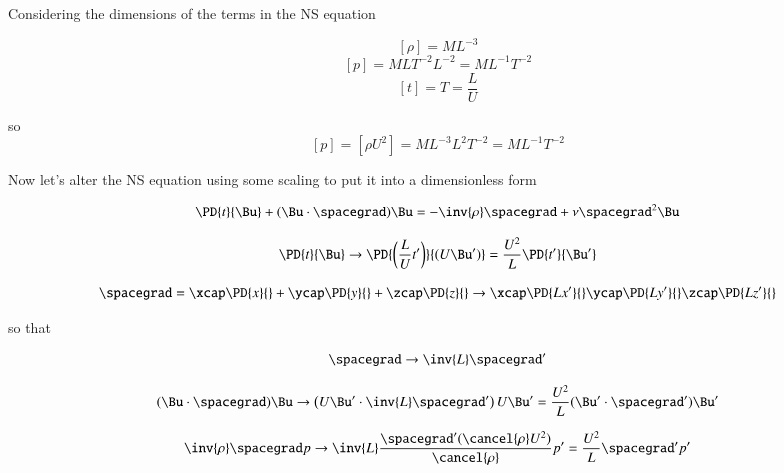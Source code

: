 Considering the dimensions of the terms in the NS equation

\begin{equation}\label{eqn:continuumL14:230}
[\rho] = M L^{-3}
\end{equation}
\begin{equation}\label{eqn:continuumL14:250}
[p] = M L T^{-2} L^{-2} = M L^{-1} T^{-2}
\end{equation}
\begin{equation}\label{eqn:continuumL14:270}
[t] = T = \frac{L}{U}
\end{equation}

so 
\begin{equation}\label{eqn:continuumL14:290}
[p] = [\rho U^2] = M L^{-3} L^2 T^{-2}  = M L^{-1} T^{-2}
\end{equation}

Now let's alter the NS equation using some scaling to put it into a dimensionless form

\begin{equation}\label{eqn:continuumL14:310}
\PD{t}{\Bu} + (\Bu \cdot \spacegrad) \Bu = - \inv{\rho} \spacegrad + \nu \spacegrad^2 \Bu
\end{equation}

\begin{equation}\label{eqn:continuumL14:330}
\PD{t}{\Bu} \rightarrow  \PD{\left(\frac{L}{U} t'\right)}{(U \Bu')} = \frac{U^2}{L} \PD{t'}{\Bu'}
\end{equation}

\begin{equation}\label{eqn:continuumL14:350}
\spacegrad = 
\xcap \PD{x}{}
+\ycap \PD{y}{}
+\zcap \PD{z}{}
\rightarrow 
\xcap \PD{L x'}{}
\ycap \PD{L y'}{}
\zcap \PD{L z'}{}
\end{equation}

so that 

\begin{equation}\label{eqn:continuumL14:370}
\spacegrad \rightarrow \inv{L} \spacegrad'
\end{equation}

\begin{equation}\label{eqn:continuumL14:390}
(\Bu \cdot \spacegrad ) \Bu \rightarrow 
\left( U \Bu' \cdot \inv{L} \spacegrad' \right) U \Bu' = \frac{U^2}{L} (\Bu' \cdot \spacegrad') \Bu'
\end{equation}

\begin{equation}\label{eqn:continuumL14:410}
\inv{\rho} \spacegrad p \rightarrow \inv{L} \frac{\spacegrad' (\cancel{\rho} U^2) }{\cancel{\rho}} p' = \frac{U^2}{L} \spacegrad' p'
\end{equation}

